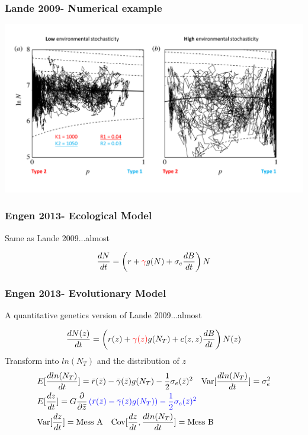 \documentclass{beamer}
\begin{document}
\begin{frame}
\frametitle{Lande 2009- Numerical example}
\includegraphics[width=\columnwidth]{LandeNumeric.pdf}
\end{frame}

\begin{frame}
\frametitle{Engen 2013- Ecological Model}
\begin{center}
Same as Lande 2009...almost
\end{center}
\begin{equation*}
\frac{d N}{dt}=\left(r+\begingroup\color{red}\gamma\endgroup g(N)+\sigma_e\frac{dB}{dt}\right)N
\end{equation*}
\end{frame}

\begin{frame}
\frametitle{Engen 2013- Evolutionary Model}
\begin{center}
A quantitative genetics version of Lande 2009...almost

\begin{equation*}
\frac{d N(z)}{dt}=\left(r(z)+\begingroup\color{red}\gamma(z)\endgroup g(N_T)+c(z,z)\frac{dB}{dt}\right)N(z)
\end{equation*}
Transform into \(ln(N_T)\) and the distribution of \(z\)
\scriptsize
\begin{equation*}
\begin{aligned}
&E[\frac{d ln(N_T)}{dt}]= \bar{r}(\bar{z})-\bar{\gamma}(\bar{z})g(N_T) -\frac{1}{2}\sigma_e(\bar{z})^2\quad \text{Var}[\frac{d ln(N_T)}{dt}]= \sigma_e^2\\
&E[\frac{dz}{dt}]= G \frac{\partial}{\partial \bar{z}}\begingroup\color{blue}\left(\bar{r}(\bar{z})-\bar{\gamma}(\bar{z})g(N_T)\right)-\frac{1}{2}\sigma_e(\bar{z})^2\endgroup\\
&\text{Var}[\frac{dz}{dt} ]= \text{Mess A} \quad\text{Cov}[\frac{dz}{dt},\frac{dln(N_T)}{dt}]= \text{Mess B} 
\end{aligned}
\end{equation*}
\normalsize
\end{center}
\end{frame}
\end{document}
